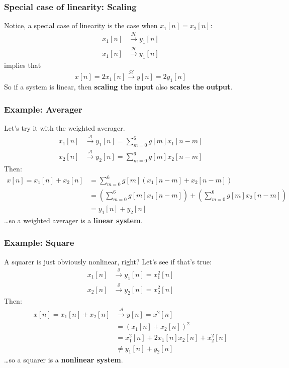 \documentclass{beamer}
\begin{document}
\begin{frame}
  \frametitle{Special case of linearity: Scaling}

  Notice, a special case of linearity is the case when $x_1[n]=x_2[n]$:
  \begin{align*}
    x_1[n] &\stackrel{\mathcal H}{\longrightarrow} y_1[n]\\
    x_1[n] &\stackrel{\mathcal H}{\longrightarrow} y_1[n]
  \end{align*}
  implies that
  \[
  x[n]=2x_1[n] \stackrel{\mathcal H}{\longrightarrow} y[n]=2y_1[n]
  \]
  So if a system is linear, then {\bf scaling the input} also {\bf
    scales the output}.
\end{frame}


\begin{frame}
  \frametitle{Example: Averager}

  Let's try it with the weighted averager.
  \begin{align*}
  x_1[n] &\stackrel{\mathcal A}{\longrightarrow} y_1[n]=\sum_{m=0}^6 g[m] x_1[n-m]\\
  x_2[n] &\stackrel{\mathcal A}{\longrightarrow} y_2[n]=\sum_{m=0}^6 g[m] x_2[n-m]
  \end{align*}
  Then:
  \begin{align*}
    x[n]=x_1[n]+x_2[n] 
    &=\sum_{m=0}^6 g[m] \left(x_1[n-m]+x_2[n-m]\right)\\
    &=\left(\sum_{m=0}^6 g[m]x_1[n-m]\right)+\left(\sum_{m=0}^6g[m]x_2[n-m]\right)\\
    &=y_1[n]+y_2[n]
  \end{align*}
  \ldots so a weighted averager is a {\bf linear system}.
\end{frame}

\begin{frame}
  \frametitle{Example: Square}

  A squarer is just obviously nonlinear, right?  Let's see if that's true:
  \begin{align*}
  x_1[n] &\stackrel{\mathcal S}{\longrightarrow} y_1[n]=x_1^2[n]\\
  x_2[n] &\stackrel{\mathcal S}{\longrightarrow} y_2[n]=x_2^2[n]
  \end{align*}
  Then:
  \begin{align*}
    x[n]=x_1[n]+x_2[n] &\stackrel{\mathcal A}{\longrightarrow} y[n]=x^2[n]\\
    &= \left(x_1[n]+x_2[n]\right)^2\\
    &=x_1^2[n]+2x_1[n]x_2[n] + x_2^2[n]\\
    &\ne y_1[n]+y_2[n]
  \end{align*}
  \ldots so a squarer is a {\bf nonlinear system}.
\end{frame}
\end{document}

